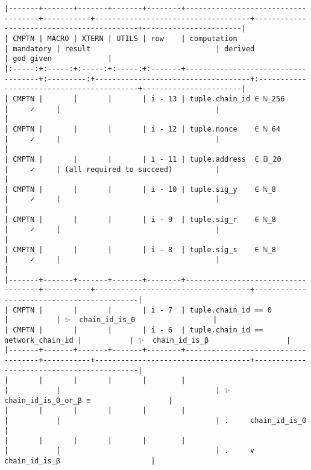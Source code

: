 \documentclass[varwidth=\maxdimen,margin=0.5cm,multi={verbatim}]{standalone}
\begin{document}
\begin{verbatim}
|-------+-------+-------+-------+--------+------------------------------------+-----------+------------------------------------+-------------------------------------------+-----------------------|
| CMPTN | MACRO | XTERN | UTILS | row    | computation                        | mandatory | result                             | derived                                   | god given             |
|:-----:+:-----:+:-----:+:-----:+:-------+------------------------------------+:---------:+------------------------------------+:------------------------------------------+-----------------------|
| CMPTN |       |       |       | i - 13 | tuple.chain_id ∈ ℕ_256             |     ✓     |                                    |                                           |
| CMPTN |       |       |       | i - 12 | tuple.nonce    ∈ ℕ_64              |     ✓     |                                    |                                           |
| CMPTN |       |       |       | i - 11 | tuple.address  ∈ 𝔹_20              |     ✓     | (all required to succeed)          |                                           |
| CMPTN |       |       |       | i - 10 | tuple.sig_y    ∈ ℕ_8               |     ✓     |                                    |                                           |
| CMPTN |       |       |       | i - 9  | tuple.sig_r    ∈ ℕ_8               |     ✓     |                                    |                                           |
| CMPTN |       |       |       | i - 8  | tuple.sig_s    ∈ ℕ_8               |     ✓     |                                    |                                           |
|-------+-------+-------+-------+--------+------------------------------------+-----------+------------------------------------+-------------------------------------------|
| CMPTN |       |       |       | i - 7  | tuple.chain_id == 0                |           | ✨  chain_id_is_0                  |
| CMPTN |       |       |       | i - 6  | tuple.chain_id == network_chain_id |           | ✨  chain_id_is_β                  |
|-------+-------+-------+-------+--------+------------------------------------+-----------+------------------------------------+-------------------------------------------|
|       |       |       |       |        |                                    |           |                                    | ✨  chain_id_is_0_or_β ≡                  |
|       |       |       |       |        |                                    |           |                                    | .     chain_id_is_0                       |
|       |       |       |       |        |                                    |           |                                    | .     ∨ chain_id_is_β                     |

\end{verbatim}
\end{document}
